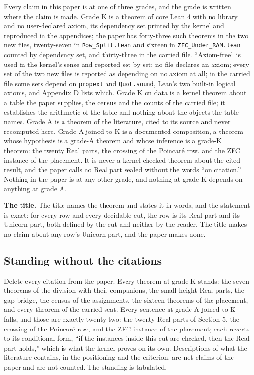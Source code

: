 \documentclass[10pt,twocolumn]{article}
\begin{document}
Every claim in this paper is at one of three grades, and the grade is
written where the claim is made. Grade K is a theorem of core Lean 4
with no library and no user-declared axiom, its dependency set printed
by the kernel and reproduced in the appendices; the paper has
forty-three such theorems in the two new files, twenty-seven in
\texttt{Row\_Split.lean} and sixteen in \texttt{ZFC\_Under\_RAM.lean}
counted by dependency set, and thirty-three in the carried file.
``Axiom-free'' is used in the kernel's sense and reported set by set: no
file declares an axiom; every set of the two new files is reported as
depending on no axiom at all; in the carried file some sets depend on
\texttt{propext} and \texttt{Quot.sound}, Lean's two built-in logical
axioms, and Appendix D lists which. Grade K on data is a kernel theorem
about a table the paper supplies, the census and the counts of the
carried file; it establishes the arithmetic of the table and nothing
about the objects the table names. Grade A is a theorem of the
literature, cited to its source and never recomputed here. Grade A
joined to K is a documented composition, a theorem whose hypothesis is a
grade-A theorem and whose inference is a grade-K theorem: the twenty
Real parts, the crossing of the Poincaré row, and the ZFC instance of
the placement. It is never a kernel-checked theorem about the cited
result, and the paper calls no Real part sealed without the words ``on
citation.'' Nothing in the paper is at any other grade, and nothing at
grade K depends on anything at grade A.

\textbf{The title.} The title names the theorem and states it in words,
and the statement is exact: for every row and every decidable cut, the
row is its Real part and its Unicorn part, both defined by the cut and
neither by the reader. The title makes no claim about any row's Unicorn
part, and the paper makes none.

\hypertarget{standing-without-the-citations}{%
\subsection{Standing without the
citations}\label{standing-without-the-citations}}

Delete every citation from the paper. Every theorem at grade K stands:
the seven theorems of the division with their companions, the
small-height Real parts, the gap bridge, the census of the assignments,
the sixteen theorems of the placement, and every theorem of the carried
seat. Every sentence at grade A joined to K falls, and those are exactly
twenty-two: the twenty Real parts of Section 5, the crossing of the
Poincaré row, and the ZFC instance of the placement; each reverts to its
conditional form, ``if the instances inside this cut are checked, then
the Real part holds,'' which is what the kernel proves on its own.
Descriptions of what the literature contains, in the positioning and the
criterion, are not claims of the paper and are not counted. The standing
is tabulated.
\end{document}
